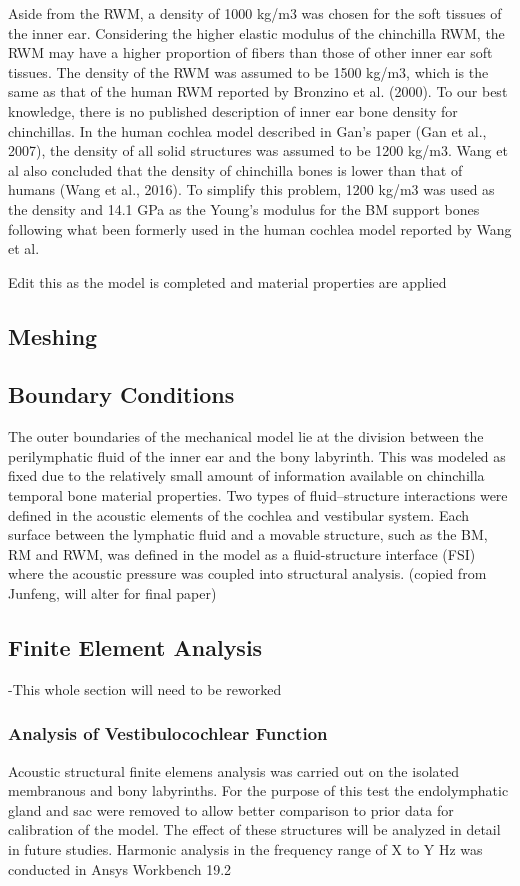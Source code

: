 \documentclass[12pt]{article}
\begin{document}
Aside from the RWM, a density of 1000 kg/m3 was chosen for the soft tissues of the inner ear. Considering the higher elastic modulus of the chinchilla RWM, the RWM may have a higher proportion of fibers than those of other inner ear soft tissues. The density of the RWM was assumed to be 1500 kg/m3, which is the same as that of the human RWM reported by Bronzino et al. (2000). To our best knowledge, there is no published description of inner ear bone density for chinchillas. In the human cochlea model described in Gan’s paper (Gan et al., 2007), the density of all solid structures was assumed to be 1200 kg/m3. Wang et al also concluded that the density of chinchilla bones is lower than that of humans (Wang et al., 2016). To simplify this problem, 1200 kg/m3 was used as the density and 14.1 GPa as the Young’s modulus for the BM support bones following what been formerly used in the human cochlea model reported by Wang et al.

Edit this as the model is completed and material properties are applied


\subsection{Meshing}


\subsection{Boundary Conditions}
The outer boundaries of the mechanical model lie at the division between the perilymphatic fluid of the inner ear and the bony labyrinth. This was modeled as fixed due to the relatively small amount of information available on chinchilla temporal bone material properties. Two types of fluid–structure interactions were defined in the acoustic elements of the cochlea and vestibular system. Each surface between the lymphatic fluid and a movable structure, such as the BM, RM and RWM, was defined in the model as a fluid-structure interface (FSI) where the acoustic pressure was coupled into structural analysis. (copied from Junfeng, will alter for final paper)

\subsection{Finite Element Analysis}
-This whole section will need to be reworked
\subsubsection{Analysis of Vestibulocochlear Function}
Acoustic structural finite elemens analysis was carried out on the isolated membranous and bony labyrinths. For the purpose of this test the endolymphatic gland and sac were removed to allow better comparison to prior data for calibration of the model. The effect of these structures will be analyzed in detail in future studies. Harmonic analysis in the frequency range of X to Y Hz was conducted in Ansys Workbench 19.2 \cite{ansys}
 
\end{document}
